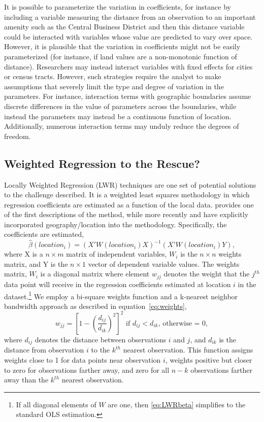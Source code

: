 \documentclass{article}\usepackage[]{graphicx}\usepackage[]{color}
\begin{document}
It is possible to parameterize the variation in coefficients, for instance by including a variable measuring the distance from an observation to an important amenity such as the Central Business District and then this distance variable could be interacted with variables whose value are predicted to vary over space. However, it is plausible that the variation in coefficients might not be easily parameterized (for instance, if land values are a non-monotonic function of distance). Researchers may instead interact variables with fixed effects for cities or census tracts. However, such strategies require the analyst to make assumptions that severely limit the type and degree of variation in the parameters. For instance, interaction terms with geographic boundaries assume discrete differences in the value of parameters across the boundaries, while instead the parameters may instead be a continuous function of location. Additionally, numerous interaction terms may unduly reduce the degrees of freedom.

\subsection{Weighted Regression to the Rescue?}
Locally Weighted Regression (LWR) techniques are one set of potential solutions to the challenge described. It is a weighted least squares methodology in which regression coefficients are estimated as a function of the local data. \citet{Cleveland1988} provides one of the first descriptions of the method, while more recently \citet{Brunsdon1998b} and \citet{Fotheringham2002} have explicitly incorporated geography/location into the methodology. Specifically, the coefficients are estimated,
\begin{equation}\label{eq:LWRbeta}
\hat{\beta}(location_i) = (X'W(location_i)X)^{-1}(X'W(location_i)Y),
\end{equation}
where X is a $n \times m$ matrix of independent variables, $W_i$ is the $n \times n$ weights matrix, and Y is the $n \times 1$ vector of dependent variable values. The weights matrix, $W_i$ is a diagonal matrix where element $w_{jj}$ denotes the weight that the $j^{th}$ data point will receive in the regression coefficients estimated at location $i$ in the dataset.\footnote{If all diagonal elements of $W$ are one, then \eqref{eq:LWRbeta} simplifies to the standard OLS estimation.} We employ a bi-square weights function and a k-nearest neighbor bandwidth approach as described in equation~\eqref{eq:weights}, 
\begin{equation}\label{eq:weights}
w_{jj}=\left[1-\left(\frac{d_{ij}}{d_{ik}}\right)^2 \right]^2 \textrm{ if }d_{ij}<d_{ik}\textrm{, otherwise = 0},
\end{equation}
where $d_{ij}$ denotes the distance between observations $i$ and $j$, and $d_{ik}$ is the distance from observation $i$ to the $k^{th}$ nearest observation. This function assigns weights close to 1 for data points near observation $i$, weights positive but closer to zero for observations farther away, and zero for all $n-k$ observations farther away than the $k^{th}$ nearest observation. 
\end{document}
